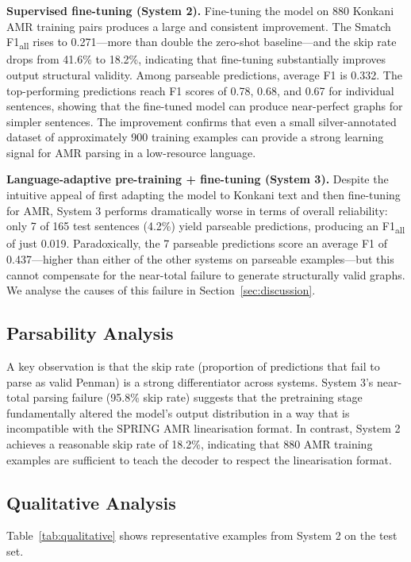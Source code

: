 \textbf{Supervised fine-tuning (System 2).}
Fine-tuning the model on 880 Konkani AMR training pairs produces a large and consistent improvement. The Smatch F1\textsubscript{all} rises to 0.271—more than double the zero-shot baseline—and the skip rate drops from 41.6\% to 18.2\%, indicating that fine-tuning substantially improves output structural validity. Among parseable predictions, average F1 is 0.332. The top-performing predictions reach F1 scores of 0.78, 0.68, and 0.67 for individual sentences, showing that the fine-tuned model can produce near-perfect graphs for simpler sentences. The improvement confirms that even a small silver-annotated dataset of approximately 900 training examples can provide a strong learning signal for AMR parsing in a low-resource language.

\textbf{Language-adaptive pre-training + fine-tuning (System 3).}
Despite the intuitive appeal of first adapting the model to Konkani text and then fine-tuning for AMR, System 3 performs dramatically worse in terms of overall reliability: only 7 of 165 test sentences (4.2\%) yield parseable predictions, producing an F1\textsubscript{all} of just 0.019. Paradoxically, the 7 parseable predictions score an average F1 of 0.437—higher than either of the other systems on parseable examples—but this cannot compensate for the near-total failure to generate structurally valid graphs. We analyse the causes of this failure in Section~\ref{sec:discussion}.

\subsection{Parsability Analysis}

A key observation is that the skip rate (proportion of predictions that fail to parse as valid Penman) is a strong differentiator across systems. System 3's near-total parsing failure (95.8\% skip rate) suggests that the pretraining stage fundamentally altered the model's output distribution in a way that is incompatible with the SPRING AMR linearisation format. In contrast, System 2 achieves a reasonable skip rate of 18.2\%, indicating that 880 AMR training examples are sufficient to teach the decoder to respect the linearisation format.

\subsection{Qualitative Analysis}

Table~\ref{tab:qualitative} shows representative examples from System 2 on the test set.

